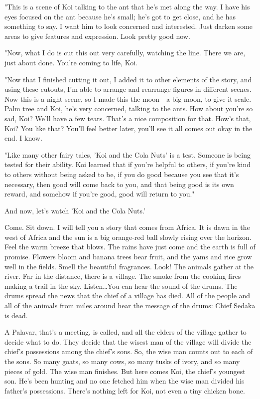 "This is a scene of Koi talking to the ant that he's met along the way. I have his eyes focused on the ant because he's small; he's got to get close, and he has something to say. I want him to look concerned and interested. Just darken some areas to give features and expression. Look pretty good now.

"Now, what I do is cut this out very carefully, watching the line. There we are, just about done. You're coming to life, Koi.

"Now that I finished cutting it out, I added it to other elements of the story, and using these cutouts, I'm able to arrange and rearrange figures in different scenes. Now this is a night scene, so I made this the moon - a big moon, to give it scale. Palm tree and Koi, he's very concerned, talking to the ants. How about you're so sad, Koi? We'll have a few tears. That's a nice composition for that. How's that, Koi? You like that? You'll feel better later, you'll see it all comes out okay in the end. I know.

"Like many other fairy tales, 'Koi and the Cola Nuts' is a test. Someone is being tested for their ability. Koi learned that if you're helpful to others, if you're kind to others without being asked to be, if you do good because you see that it's necessary, then good will come back to you, and that being good is its own reward, and somehow if you're good, good will return to you."

And now, let's watch 'Koi and the Cola Nuts.'

Come. Sit down. I will tell you a story that comes from Africa. It is dawn in the west of Africa and the sun is a big orange-red ball slowly rising over the horizon. Feel the warm breeze that blows. The rains have just come and the earth is full of promise. Flowers bloom and banana trees bear fruit, and the yams and rice grow well in the fields. Smell the beautiful fragrances. Look! The animals gather at the river. Far in the distance, there is a village. The smoke from the cooking fires making a trail in the sky. Listen\dots You can hear the sound of the drums. The drums spread the news that the chief of a village has died. All of the people and all of the animals from miles around hear the message of the drums: Chief Sedaka is dead.

A Palavar, that's a meeting, is called, and all the elders of the village gather to decide what to do. They decide that the wisest man of the village will divide the chief's possessions among the chief's sons. So, the wise man counts out to each of the sons. So many goats, so many cows, so many tusks of ivory, and so many pieces of gold. The wise man finishes. But here comes Koi, the chief's youngest son. He's been hunting and no one fetched him when the wise man divided his father's possessions. There's nothing left for Koi, not even a tiny chicken bone.

